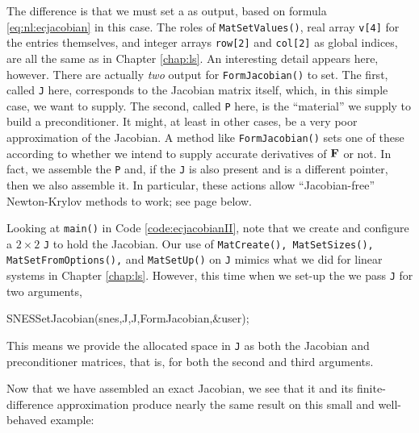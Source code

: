 
The difference is that we must set a \pMat as output, based on formula \eqref{eq:nl:ecjacobian} in this case.  The roles of \texttt{MatSetValues()}, real array \texttt{v[4]} for the entries themselves, and integer arrays \texttt{row[2]} and \texttt{col[2]} as global indices, are all the same as in Chapter \ref{chap:ls}.  An interesting detail appears here, however.  There are actually \emph{two} output \pMats for \texttt{FormJacobian()} to set.  The first, called \texttt{J} here, corresponds to the Jacobian matrix itself, which, in this simple case, we want to supply.  The second, called \texttt{P} here, is the ``material'' we supply to build a preconditioner.  It might, at least in other cases, be a very poor approximation of the Jacobian.  A method like \texttt{FormJacobian()} sets one of these \pMats according to whether we intend to supply accurate derivatives of $\mathbf{F}$ or not.  In fact, we assemble the \pMat \texttt{P} and, if the \pMat \texttt{J} is also present and is a different pointer, then we also assemble it.  In particular, these actions allow ``Jacobian-free'' Newton-Krylov methods to work; see page \pageref{sec:JFNK} below.

Looking at \texttt{main()} in Code \ref{code:ecjacobianII}, note that we create and configure a $2\times 2$ \pMat \texttt{J} to hold the Jacobian.  Our use of \texttt{MatCreate(), MatSetSizes(), MatSetFromOptions(),} and \texttt{MatSetUp()} on \texttt{J} mimics what we did for linear systems in Chapter \ref{chap:ls}.  However, this time when we set-up the \pSNES we pass \texttt{J} for two arguments,
\begin{code}
SNESSetJacobian(snes,J,J,FormJacobian,&user);
\end{code}
This means we provide the allocated space in \texttt{J} as both the Jacobian and preconditioner matrices, that is, for both the second and third \pMat arguments.

Now that we have assembled an exact Jacobian, we see that it and its finite-difference approximation produce nearly the same result on this small and well-behaved example:

